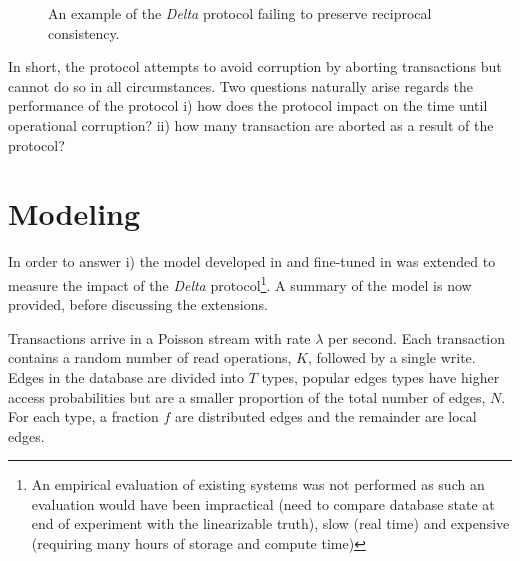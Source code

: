 \documentclass[sigplan,10pt]{acmart}
\begin{document}
\begin{figure}[ht]
  \centering
  \caption{An example of the \emph{Delta} protocol failing to preserve reciprocal consistency.}
  \label{corruption-again}
\end{figure}

In short, the protocol attempts to avoid corruption by aborting transactions but cannot do so in all circumstances. Two questions naturally arise regards the performance of the protocol i) how does the protocol impact on the time until operational corruption? ii) how many transaction are aborted as a result of the protocol?

\section{Modeling}
\label{sec:modeling}

In order to answer i) the model developed in \cite{Ezhilchelvan2018} and fine-tuned in \cite{Webber2019} was extended to measure the impact of the \emph{Delta} protocol\footnote{An empirical evaluation of existing systems was not performed as such an evaluation would have been impractical (need to compare database state at end of experiment with the linearizable truth), slow (real time) and expensive (requiring many hours of storage and compute time)}. A summary of the model is now provided, before discussing the extensions.

Transactions arrive in a Poisson stream with rate $\lambda$ per second. Each transaction contains a random number of read operations, $K$, followed by a single write. Edges in the database are divided into $T$ types, popular edges types have higher access probabilities but are a smaller proportion of the total number of edges, $N$. For each type, a fraction $f$ are distributed edges and the remainder are local edges.
\end{document}
